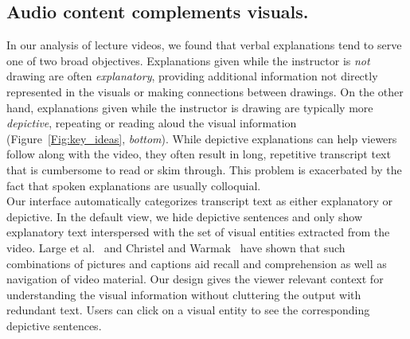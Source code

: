 \subsection*{Audio content complements visuals.}
In our analysis of lecture videos, we found that verbal explanations tend to serve one of two broad objectives. Explanations given while the instructor is \emph{not} drawing are often \emph{explanatory}, providing additional information not directly represented in the visuals or making connections between drawings. On the other hand, explanations given while the instructor is drawing are typically more \emph{depictive}, repeating or reading aloud the visual information (Figure~\ref{Fig:key_ideas}, \textit{bottom}).
%
While depictive explanations can help viewers follow along with the video, they often result in long, repetitive transcript text that is cumbersome to read or skim through. This problem is exacerbated by the fact that spoken explanations are usually colloquial.\\

Our interface automatically categorizes transcript text as either explanatory or depictive. In the default view, we hide depictive sentences and only show explanatory text interspersed with the set of visual entities extracted from the video. 
Large et al.~\cite{large1995multimedia} and Christel and Warmak~\cite{christel2001effect} have shown that such combinations of pictures and captions aid recall and comprehension as well as navigation of video material.
%
Our design gives the viewer relevant context for understanding the visual information without cluttering the output with redundant text. Users can click on a visual entity to see the corresponding depictive sentences.
\cleardoublepage
